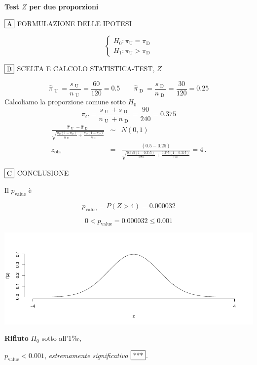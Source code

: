 \documentclass[
  11pt,
]{book}
\theoremstyle{mytheoremstyle}
\theoremstyle{mydefstyle}
\newenvironment{sol}
  {
  \begin{tcolorbox}[enhanced,breakable,arc=0.1mm,boxrule=1pt,colback=white,colframe=iblue,
  title=\bf \fontfamily{lmss}\selectfont \hspace{.5 cm} Soluzione,drop fuzzy shadow]

}{
\end{tcolorbox}
  }
\begin{document}
\begin{sol}
\textbf{Test \(Z\) per due proporzioni}

\(\fbox{A}\) FORMULAZIONE DELLE IPOTESI

\[\begin{cases}
   H_0: \pi_\text{U} = \pi_\text{D} \\
   H_1: \pi_\text{U} > \pi_\text{D} 
   \end{cases}\]

\(\fbox{B}\) SCELTA E CALCOLO STATISTICA-TEST, \(Z\)

\[\hat\pi_\text{ U }=\frac{s_\text{ U }}{n_\text{ U }}=\frac{ 60 }{ 120 }= 0.5 \qquad
   \hat\pi_\text{ D }=\frac{s_\text{ D }}{n_\text{ D }}=\frac{ 30 }{ 120 }= 0.25 \]Calcoliamo la proporzione comune sotto \(H_0\)
\[
     \pi_C=\frac{s_\text{ U }+s_\text{ D }}{n_\text{ U }+n_\text{ D }}=
     \frac{ 90 }{ 240 }= 0.375 
   \]\begin{eqnarray*}
   \frac{\hat\pi_\text{ U } - \hat\pi_\text{ D }}
   {\sqrt{\frac {\pi_C(1-\pi_C)}{n_\text{ U }}+\frac {\pi_C(1-\pi_C)}{n_\text{ D }}}}&\sim&N(0,1)\\
   z_{\text{obs}}
   &=& \frac{ ( 0.5 -  0.25 )} {\sqrt{\frac{ 0.375 (1- 0.375 )}{ 120 }+\frac{ 0.375 (1- 0.375 )}{ 120 }}}
   =   4 \, .
   \end{eqnarray*}

\(\fbox{C}\) CONCLUSIONE

Il \(p_{\text{value}}\) è

\[ p_{\text{value}} = P(Z>4)=0.000032 \]

\[
 0 < p_\text{value}= 0.000032 \leq 0.001 
\]

\begin{center}\includegraphics{Esami_passati_con_soluzioni_files/figure-latex/05-test-16,-1} \end{center}

\textbf{Rifiuto} \(H_0\) sotto all'1‰,

\(p_\text{value}<0.001\), \emph{estremamente significativo} \(\fbox{***}\).

\end{sol}
\end{document}
